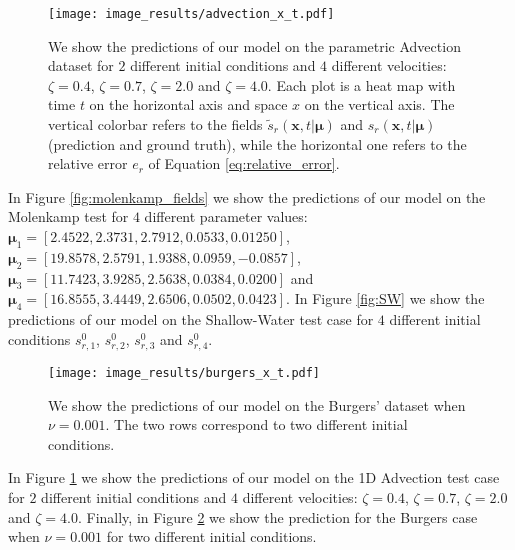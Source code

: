 \begin{figure}
  \centering
  \texttt{[image: image\_results/advection\_x\_t.pdf]}
  \caption{We show the predictions of our model on the parametric Advection dataset for $2$ different initial conditions and $4$ different velocities: $\zeta=0.4$, $\zeta=0.7$, $\zeta=2.0$ and $\zeta=4.0$. Each plot is a heat map with time $t$ on the horizontal axis and space $x$ on the vertical axis. The vertical colorbar refers to the fields $\tilde{s}_r(\mathbf{x},t|\pmb{\mu})$ and $s_r(\mathbf{x},t|\pmb{\mu})$ (prediction and ground truth), while the horizontal one refers to the relative error $e_r$ of Equation \ref{eq:relative_error}.} 
  \label{fig:advection_x_t}
\end{figure}
In Figure \ref{fig:molenkamp_fields} we show the predictions of our model on the Molenkamp test for $4$ different parameter values: $\pmb{\mu}_1= [2.4522 ,2.3731 ,  2.7912  ,0.0533,0.01250]$, $\pmb{\mu}_2=[19.8578  ,   2.5791  , 1.9388 ,  0.0959, -0.0857]$, $\pmb{\mu}_3=[11.7423 ,   3.9285   , 2.5638 ,  0.0384,  0.0200]$ and $\pmb{\mu}_4=[16.8555  , 3.4449  , 2.6506  , 0.0502 , 0.0423]$.
In Figure \ref{fig:SW} we show the predictions of our model on the Shallow-Water test case for $4$ different initial conditions $s^0_{r,1}$, $s^0_{r,2}$, $s^0_{r,3}$ and $s^0_{r,4}$. 
\begin{figure}
  \centering
  \texttt{[image: image\_results/burgers\_x\_t.pdf]}
  \caption{We show the predictions of our model on the Burgers' dataset when $\nu=0.001$. The two rows correspond to two different initial conditions.} 
  \label{fig:burgers_x_t}
\end{figure}
In Figure \ref{fig:advection_x_t} we show the predictions of our model on the 1D Advection test case for $2$ different initial conditions and  $4$ different velocities: $\zeta=0.4$, $\zeta=0.7$, $\zeta=2.0$ and $\zeta=4.0$. Finally, in Figure \ref{fig:burgers_x_t} we show the prediction for the Burgers case when $\nu=0.001$ for two different initial conditions.


